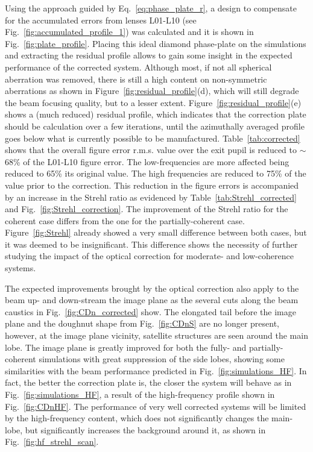 \begin{refsection}
Using the approach guided by Eq.~\ref{eq:phase_plate_r}, a design to compensate for the accumulated errors from lenses L01-L10 (see  Fig.~\ref{fig:accumulated_profile_1}) was calculated and it is shown in Fig.~\ref{fig:plate_profile}. Placing this ideal diamond phase-plate on the simulations and extracting the residual profile allows to gain some insight in the expected performance of the corrected system. Although most, if not all spherical aberration was removed, there is still a high content on non-symmetric aberrations as shown in Figure~\ref{fig:residual_profile}(d), which will still degrade the beam focusing quality, but to a lesser extent. Figure~\ref{fig:residual_profile}(e) shows a (much reduced) residual profile, which indicates that the correction plate should be calculation over a few iterations, until the azimuthally averaged profile goes below what is currently possible to be manufactured. Table~\ref{tab:corrected} shows that the overall figure error r.m.s. value over the exit pupil is reduced to $\sim$68\% of the L01-L10 figure error. The low-frequencies are more affected being reduced to 65\% its original value. The high frequencies are reduced to 75\% of the value prior to the correction. This reduction in the figure errors is accompanied by an increase in the Strehl ratio as evidenced by Table~\ref{tab:Strehl_corrected} and Fig.~\ref{fig:Strehl_correction}. The improvement of the Strehl ratio for the coherent case differs from the one for the partially-coherent case. Figure~\ref{fig:Strehl} already showed a very small difference between both cases, but it was deemed to be insignificant. This difference shows the necessity of further studying the impact of the optical correction for moderate- and low-coherence systems.

The expected improvements brought by the optical correction also apply to the beam up- and down-stream the image plane as the several cuts along the beam caustics in Fig.~\ref{fig:CDn_corrected} show. The elongated tail before the image plane and the doughnut shape from Fig.~\ref{fig:CDnS} are no longer present, however, at the image plane vicinity, satellite structures are seen around the main lobe. The image plane is greatly improved for both the fully- and partially-coherent simulations with great suppression of the side lobes, showing some similarities with the beam performance predicted in Fig.~\ref{fig:simulations_HF}. In fact, the better the correction plate is, the closer the system will behave as in Fig.~\ref{fig:simulations_HF}, a result of the high-frequency profile shown in Fig.~\ref{fig:CDnHF}. The performance of very well corrected systems will be limited by the high-frequency content, which does not significantly changes the main-lobe, but significantly increases the background around it, as shown in Fig.~\ref{fig:hf_strehl_scan}.


\end{refsection}
